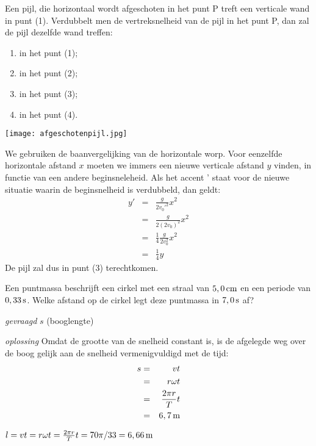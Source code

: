 \begin{exercise} Een pijl, die horizontaal wordt afgeschoten in het punt P
treft een verticale wand in punt (1). Verdubbelt men de
vertreksnelheid van de pijl in het punt P, dan zal de pijl dezelfde
wand treffen:
\begin{enumerate}
\item in het punt (1);
\item in het punt (2);
\item in het punt (3);
\item in het punt (4).
\end{enumerate}
\begin{center}
\texttt{[image: afgeschotenpijl.jpg]}
\end{center}
\begin{oplossing}
We gebruiken de baanvergelijking van de
horizontale worp. Voor eenzelfde horizontale afstand $x$ moeten we
immers een nieuwe verticale afstand $y$ vinden, in functie van een
andere beginsneleheid. Als het accent ' staat voor de nieuwe
situatie waarin de beginsnelheid is verdubbeld, dan geldt:
\begin{eqnarray*}
y'&=&\frac{g}{2v_0'^2}x^2\\
&=&\frac{g}{2(2v_0)^2}x^2\\
&=&\frac{1}{4}\frac{g}{2v_0^2}x^2\\
&=&\frac{1}{4}y
\end{eqnarray*}
De pijl zal dus in punt (3) terechtkomen.
\end{oplossing}

\end{exercise}

\begin{exercise} Een puntmassa beschrijft een cirkel met een straal van $5,0\rm\,cm$ en een periode van $0,33\rm\,s$. Welke afstand op de cirkel legt deze puntmassa in $7,0\rm\,s$ af?
\begin{oplossing}
\textit{gevraagd}  $s$ (booglengte)

\textit{oplossing} Omdat de grootte van de snelheid constant is, is de
afgelegde weg over de boog gelijk aan de snelheid vermenigvuldigd met de tijd:
\begin{eqnarray*}
s&=&vt\\
&=&r\omega t\\
&=&\frac{2\pi r}{T}t\\
&=&6,7\rm\,m
\end{eqnarray*}
\end{oplossing}
\begin{oplossing}
$l=vt=r\omega t=\frac{2\pi r}{T}t=70\pi/33=6,66\rm\,m$
\end{oplossing}



\end{exercise}

